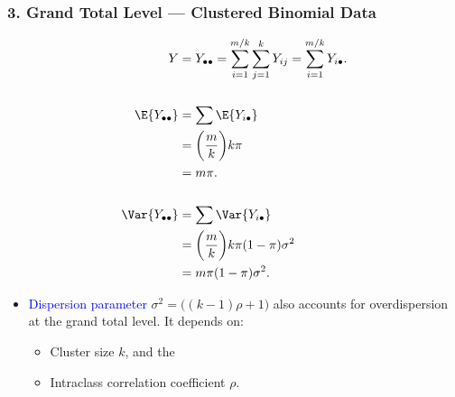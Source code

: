 \documentclass[oneside]{book}\usepackage[]{graphicx}\usepackage[svgnames]{xcolor}
\begin{document}
\subsubsection*{3. Grand Total Level --- Clustered Binomial Data}
\begin{align*}
    Y                        & =Y_{\bullet\bullet} =\sum_{i=1}^{m/k}\sum_{j=1}^{k}Y_{ij}=\sum_{i=1}^{m/k}Y_{i\bullet}. \\\\
    \E{Y_{\bullet\bullet}}   & =\sum \E{Y_{i\bullet}}                                                                  \\
                             & =\biggl(\frac{m}{k}\biggr)k\pi                                                          \\
                             & =m\pi.                                                                                  \\\\
    \Var{Y_{\bullet\bullet}} & =\sum\Var{Y_{i\bullet}}                                                                 \\
                             & =\biggl(\frac{m}{k}\biggr)k\pi(1-\pi)\sigma^2                                           \\
                             & =m\pi(1-\pi)\sigma^2.
\end{align*}
\begin{itemize}
    \item \textcolor{Blue}{Dispersion parameter} $ \sigma^2=\bigl((k-1)\rho+1\bigr) $ also accounts for overdispersion at the
          grand total level. It depends on:
          \begin{itemize}
              \item Cluster size $ k $, and the
              \item Intraclass correlation coefficient $ \rho $.
          \end{itemize}
\end{itemize}
\end{document}
